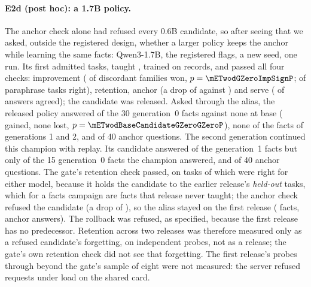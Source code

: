 \paragraph{E2d (post hoc): a 1.7B policy.} The anchor check alone had refused every 0.6B candidate, so after seeing that
we asked, outside the registered design, whether a larger policy keeps the anchor while learning the same facts: Qwen3-1.7B,
the registered flags, a new seed, one run. Its first  admitted \mETwodGZeroTasks{} tasks, taught \mETwodGZeroTaught{}, trained
on \mETwodGZeroTrainRecords{} records, and passed all four checks: improvement (\mETwodGZeroImpSignWins{} of \mETwodGZeroImpSignDiscordant{}
discordant families won, $p=\mETwodGZeroImpSignP$; \mETwodGZeroImpVariantsRight{} of \mETwodGZeroImpVariantsN{} paraphrase tasks right),
retention, anchor (a drop of \mETwodGZeroAnchorDrop{} against \mETwodGZeroAnchorBound) and serve (\mETwodGZeroServeAgreed{} of
\mETwodGZeroServeSampled{} answers agreed); the candidate was released. Asked through the alias, the released policy answered
\mETwodAfterGZeroGZero{} of the 30 generation~0 facts against none at base (\mETwodBaseCandidateGZeroGZeroGained{} gained, none lost,
$p=\mETwodBaseCandidateGZeroGZeroP$), none of the facts of generations 1 and 2, and \mETwodAfterGZeroAnchor{} of 40 anchor
questions. The second generation continued this champion with replay. Its candidate answered \mETwodCandidateGOneGOne{} of the
generation~1 facts but only \mETwodCandidateGOneGZero{} of the 15 generation~0 facts the champion answered, and \mETwodCandidateGOneAnchor{} of
40 anchor questions. The gate's retention check passed, on \mETwodGOneRetentionTasks{} tasks of which \mETwodGOneRetentionRight{} were right for
either model, because it holds the candidate to the earlier release's \emph{held-out} tasks, which for a facts campaign are facts that release
never taught; the anchor check refused the candidate (a drop of \mETwodGOneAnchorDrop), so the alias stayed on the first release
(\mETwodAfterGOneGZero{} facts, \mETwodAfterGOneAnchor{} anchor answers). The rollback was refused, as specified, because the first release has
no predecessor. Retention across two releases was therefore measured only as a refused candidate's forgetting, on independent probes,
not as a release; the gate's own retention check did not see that forgetting. The first release's probes through 
beyond the gate's sample of eight were not measured: the server refused requests under load on the shared card.


